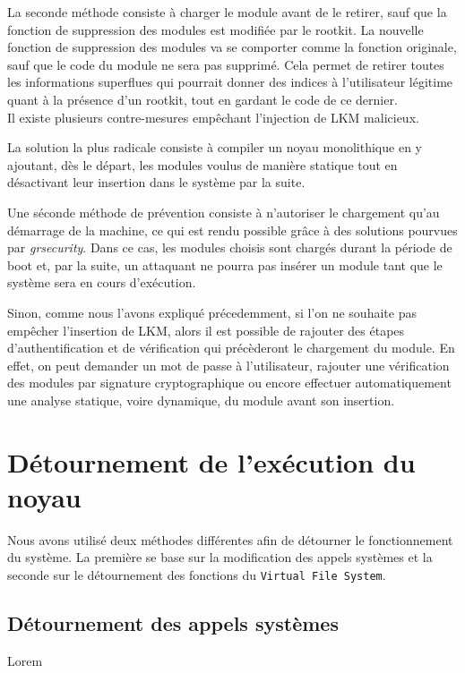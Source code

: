 \documentclass[11pt]{article}
\begin{document}
		La seconde méthode consiste à charger le module avant de le retirer, sauf que la fonction de suppression des modules est modifiée par le rootkit. La nouvelle fonction de suppression des modules va se comporter comme la fonction originale, sauf que le code du module ne sera pas supprimé. Cela permet de retirer toutes les informations superflues qui pourrait donner des indices à l'utilisateur légitime quant à la présence d'un rootkit, tout en gardant le code de ce dernier. \\
		
		Il existe plusieurs contre-mesures empêchant l'injection de LKM malicieux.

		La solution la plus radicale consiste à compiler un noyau monolithique en y ajoutant, dès le départ, les modules voulus de manière statique tout en désactivant leur insertion dans le système par la suite.

		Une séconde méthode de prévention consiste à n'autoriser le chargement qu'au démarrage de la machine, ce qui est rendu possible grâce à des solutions pourvues par \textit{grsecurity}. Dans ce cas, les modules choisis sont chargés durant la période de boot et, par la suite, un attaquant ne pourra pas insérer un module tant que le système sera en cours d'exécution.

		Sinon, comme nous l'avons expliqué précedemment, si l'on ne souhaite pas empêcher l'insertion de LKM, alors il est possible de rajouter des étapes d'authentification et de vérification qui précèderont le chargement du module. En effet, on peut demander un mot de passe à l'utilisateur, rajouter une vérification des modules par signature cryptographique ou encore effectuer automatiquement une analyse statique, voire dynamique, du module avant son insertion.
	
\section{Détournement de l'exécution du noyau}	

Nous avons utilisé deux méthodes différentes afin de détourner le fonctionnement du système. La première se base sur la modification des appels systèmes et la seconde sur le détournement des fonctions du \texttt{Virtual File System}.

	\subsection{Détournement des appels systèmes}
	Lorem
\end{document}
